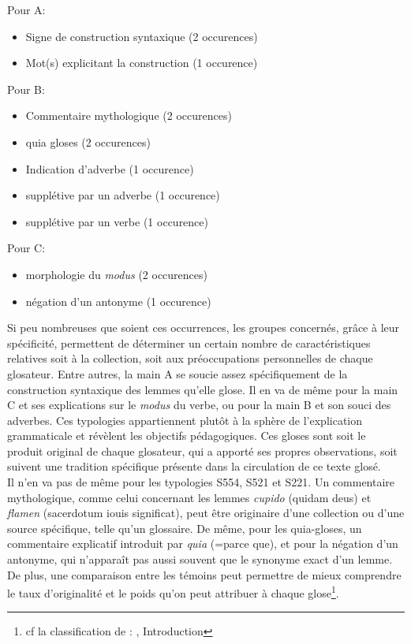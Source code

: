 \documentclass[a4paper, twoside, 12pt]{book}
\begin{document}
{Pour A:

\begin{itemize}
    \item {} Signe de construction syntaxique (2 occurences)
    \item {} Mot(s) explicitant la construction (1 occurence)
\end{itemize}

Pour B:

\begin{itemize}
    \item {} Commentaire mythologique (2 occurences)
    \item {} \og{} quia\fg{} gloses (2 occurences)
    \item {} Indication d'adverbe (1 occurence)
    \item {} supplétive par un adverbe (1 occurence)
    \item {} supplétive par un verbe (1 occurence)
\end{itemize}

Pour C:

\begin{itemize}
    \item {} morphologie du \textit{modus} (2 occurences)
    \item {} négation d'un antonyme (1 occurence)\\
\end{itemize}

Si peu nombreuses que soient ces occurrences, les groupes concernés, grâce à leur spécificité, permettent de déterminer un certain nombre de caractéristiques relatives soit à la collection, soit aux préoccupations personnelles de chaque glosateur. Entre autres, la main A se soucie assez spécifiquement de la construction syntaxique des lemmes qu'elle glose. Il en va de même pour la main C et ses explications sur le \textit{modus} du verbe, ou pour la main B et son souci des adverbes. Ces typologies appartiennent plutôt à la sphère de l'explication grammaticale et révèlent les objectifs pédagogiques. Ces gloses sont soit le produit original de chaque glosateur, qui a apporté ses propres observations, soit suivent une tradition spécifique présente dans la circulation de ce texte glosé.\\

Il n'en va pas de même pour les typologies S554, S521 et S221. Un commentaire mythologique, comme celui concernant les lemmes \textit{cupido} (quidam deus) et \textit{flamen} (sacerdotum iouis significat), peut être originaire d'une collection ou d'une source spécifique, telle qu'un glossaire. De même, pour les \og{}quia-gloses\fg{}, un commentaire explicatif introduit par \textit{quia} (=parce que), et pour la négation d'un antonyme, qui n'apparaît pas aussi souvent que le synonyme exact d'un lemme. De plus, une comparaison entre les témoins peut permettre de mieux comprendre le taux d'originalité et le \og{}poids\fg{} qu'on peut attribuer à chaque glose\footnote{cf la classification de : \cite{steinova2021glosses}, Introduction}.\\

}
\end{document}
